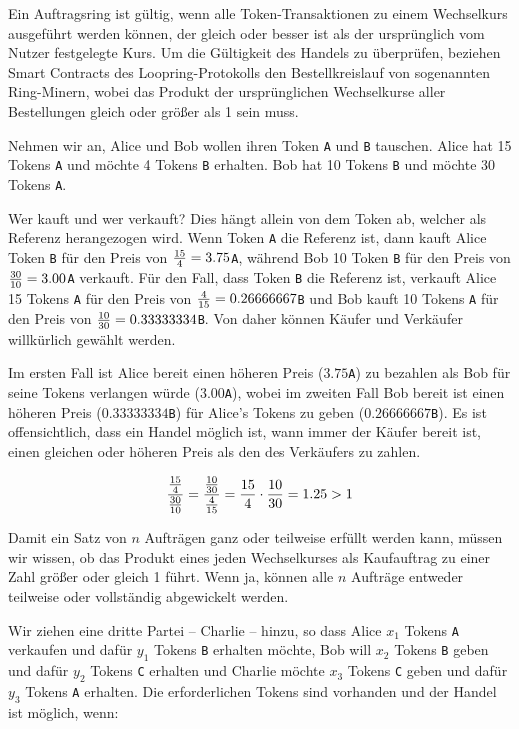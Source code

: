 \documentclass[UTF8,nofonts]{article}
\begin{document}
\begin{multicols}{2}
Ein Auftragsring ist gültig, wenn alle Token-Transaktionen zu einem Wechselkurs ausgeführt werden können, der gleich oder besser ist als der ursprünglich vom Nutzer festgelegte Kurs. Um die Gültigkeit des Handels zu überprüfen, beziehen Smart Contracts des Loopring-Protokolls den Bestellkreislauf von sogenannten Ring-Minern, wobei das Produkt der ursprünglichen Wechselkurse aller Bestellungen gleich oder größer als 1 sein muss.

Nehmen wir an, Alice und Bob wollen ihren Token \verb|A| und \verb|B| tauschen. Alice hat 15 Tokens \verb|A| und möchte 4 Tokens \verb|B| erhalten. Bob hat 10 Tokens \verb|B| und möchte 30 Tokens \verb|A|.

Wer kauft und wer verkauft? Dies hängt allein von dem Token ab, welcher als Referenz herangezogen wird. Wenn Token \verb|A| die Referenz ist, dann kauft Alice Token \verb|B| für den Preis von ${15 \over 4} = 3.75$\verb|A|, während Bob 10 Token \verb|B| für den Preis von ${30 \over 10} = 3.00$\verb|A| verkauft. Für den Fall, dass Token \verb|B| die Referenz ist, verkauft Alice 15 Tokens \verb|A| für den Preis von ${4\over 15}=0.26666667$\verb|B| und Bob kauft 10 Tokens \verb|A| für den Preis von ${10 \over 30}=0.33333334$\verb|B|. Von daher können Käufer und Verkäufer willkürlich gewählt werden.

Im ersten Fall ist Alice bereit einen höheren Preis ($3.75$\verb|A|) zu bezahlen als Bob für seine Tokens verlangen würde ($3.00$\verb|A|), wobei im zweiten Fall Bob bereit ist einen höheren Preis ($0.33333334$\verb|B|) für Alice's Tokens zu geben ($0.26666667$\verb|B|). Es ist offensichtlich, dass ein Handel möglich ist, wann immer der Käufer bereit ist, einen gleichen oder höheren Preis als den des Verkäufers zu zahlen.

\begin{equation}
{{15\over 4} \over {30\over 10}} = {{10\over 30} \over {4\over 15}}={15 \over 4} \cdot {10 \over 30} = 1.25 > 1
\end{equation}

Damit ein Satz von $n$ Aufträgen ganz oder teilweise erfüllt werden kann, müssen wir wissen, ob das Produkt eines jeden Wechselkurses als Kaufauftrag zu einer Zahl größer oder gleich 1 führt. Wenn ja, können alle $n$ Aufträge entweder teilweise oder vollständig abgewickelt werden.

Wir ziehen eine dritte Partei – Charlie – hinzu, so dass Alice $x_1$ Tokens \verb|A| verkaufen und dafür $y_1$ Tokens \verb|B| erhalten möchte, Bob will $x_2$ Tokens \verb|B| geben und dafür $y_2$ Tokens \verb|C| erhalten und Charlie möchte $x_3$ Tokens \verb|C| geben und dafür $y_3$ Tokens \verb|A| erhalten. Die erforderlichen Tokens sind vorhanden und der Handel ist möglich, wenn:


\end{multicols}
\end{document}
